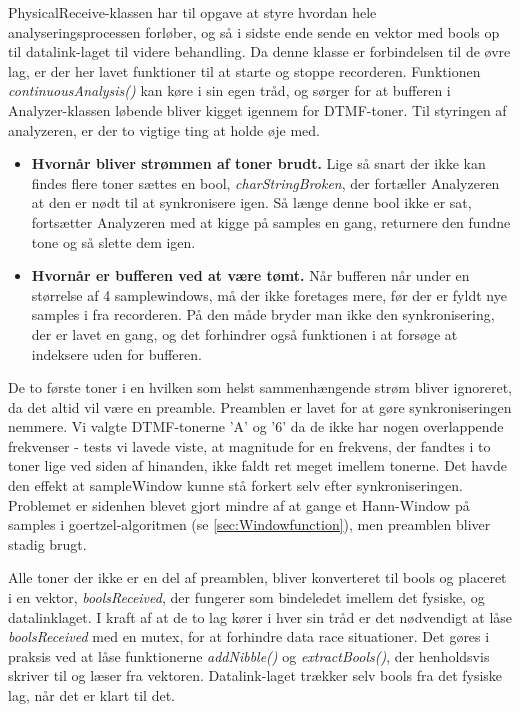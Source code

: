 PhysicalReceive-klassen har til opgave at styre hvordan hele analyseringsprocessen forløber, og så i sidste ende sende en vektor med bools op til datalink-laget til videre behandling. Da denne klasse er forbindelsen til de øvre lag, er der her lavet funktioner til at starte og stoppe recorderen. Funktionen \textit{continuousAnalysis()} kan køre i sin egen tråd, og sørger for at bufferen i Analyzer-klassen løbende bliver kigget igennem for DTMF-toner. Til styringen af analyzeren, er der to vigtige ting at holde øje med.

\begin{itemize}

\item \textbf{Hvornår bliver strømmen af toner brudt.} Lige så snart der ikke kan findes flere toner sættes en bool, \textit{charStringBroken}, der fortæller Analyzeren at den er nødt til at synkronisere igen. Så længe denne bool ikke er sat, fortsætter Analyzeren med at kigge på samples en gang, returnere den fundne tone og så slette dem igen. 
\item \textbf{Hvornår er bufferen ved at være tømt.} Når bufferen når under en størrelse af 4 samplewindows, må der ikke foretages mere, før der er fyldt nye samples i fra recorderen. På den måde bryder man ikke den synkronisering, der er lavet en gang, og det forhindrer også funktionen i at forsøge at indeksere uden for bufferen.
\end{itemize}

De to første toner i en hvilken som helst sammenhængende strøm bliver ignoreret, da det altid vil være en preamble. Preamblen er lavet for at gøre synkroniseringen nemmere. Vi valgte DTMF-tonerne 'A' og '6' da de ikke har nogen overlappende frekvenser - tests vi lavede viste, at magnitude for en frekvens, der fandtes i to toner lige ved siden af hinanden, ikke faldt ret meget imellem tonerne. Det havde den effekt at sampleWindow kunne stå forkert selv efter synkroniseringen. Problemet er sidenhen blevet gjort mindre af at gange et Hann-Window på samples i goertzel-algoritmen (se \ref{sec:Windowfunction}), men preamblen bliver stadig brugt. 


Alle toner der ikke er en del af preamblen, bliver konverteret til bools og placeret i en vektor, \textit{boolsReceived}, der fungerer som bindeledet imellem det fysiske, og datalinklaget. I kraft af at de to lag kører i hver sin tråd er det nødvendigt at låse \textit{boolsReceived} med en mutex, for at forhindre data race situationer. Det gøres i praksis ved at låse funktionerne \textit{addNibble()} og \textit{extractBools()}, der henholdsvis skriver til og læser fra vektoren. Datalink-laget trækker selv bools fra det fysiske lag, når det er klart til det.\\


